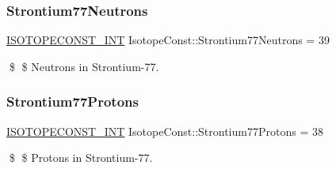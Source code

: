 \subsubsection{\texorpdfstring{Strontium77\+Neutrons}{Strontium77Neutrons}}
{\footnotesize\ttfamily \mbox{\hyperlink{group___isotope_const-_macros_ga5f18360b3e99483a35c32d789e62621c}{I\+S\+O\+T\+O\+P\+E\+C\+O\+N\+S\+T\+\_\+\+I\+NT}} Isotope\+Const\+::\+Strontium77\+Neutrons = 39}

\$ \$ Neutrons in Strontium-\/77. \mbox{\label{group___isotope_const-_strontium-_sr77_ga9063cd725807e9bb16f183de2458d1ba}} 
\subsubsection{\texorpdfstring{Strontium77\+Protons}{Strontium77Protons}}
{\footnotesize\ttfamily \mbox{\hyperlink{group___isotope_const-_macros_ga5f18360b3e99483a35c32d789e62621c}{I\+S\+O\+T\+O\+P\+E\+C\+O\+N\+S\+T\+\_\+\+I\+NT}} Isotope\+Const\+::\+Strontium77\+Protons = 38}

\$ \$ Protons in Strontium-\/77. 